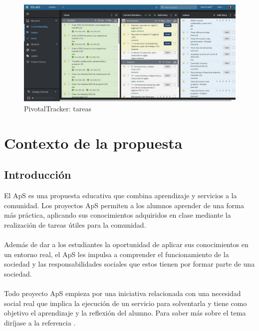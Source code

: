 \documentclass[11pt]{book}
\begin{document}
	\begin{figure}[t]
		\centering
		\includegraphics[scale=0.44]{pivotal2}
		\caption{PivotalTracker: tareas}
		\label{fig:pivotal2}
	\end{figure}
	\chapter{Contexto de la propuesta}\label{cap:contexto}
	\section{Introducción}
	El ApS es una propuesta educativa que combina aprendizaje y servicios a la comunidad. Los proyectos  ApS permiten a los alumnos aprender de una forma más práctica, aplicando sus conocimientos adquiridos en clase mediante la realización de tareas útiles para la comunidad. \\\\
	Además de dar a los estudiantes la oportunidad de aplicar sus conocimientos en un entorno real, el ApS les impulsa a comprender el funcionamiento de la sociedad y las responsabilidades sociales que estos tienen por formar parte de una sociedad.\\\\
	Todo proyecto ApS empieza por una iniciativa relacionada con una necesidad social real que implica la ejecución de un servicio para solventarla y tiene como objetivo el aprendizaje y la reflexión del alumno. Para saber más sobre el tema diríjase a la referencia \cite{rego2015aprendizaje}.
\end{document}
